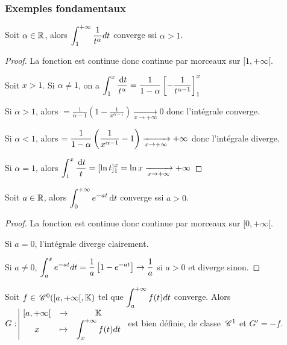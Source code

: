 \subsubsection{Exemples fondamentaux }

\begin{proposition}{}{}
    Soit $\alpha \in \mathbb{R}$, alors $\displaystyle \int_{1 }^{+ \infty   } \frac{1}{t^\alpha} dt$ converge
    ssi $\alpha > 1$. 
\end{proposition}

\begin{proof}
    La fonction est continue donc continue par morceaux sur $[1, + \infty[$.

    Soit $x > 1$. Si $\alpha \neq 1$, on a $\displaystyle \int_{1 }^{x } \frac {\,\mathrm{d}t} {t^\alpha} = \frac{1}{1 - \alpha} \left[ - \frac{1}{t^{\alpha - 1}} \right]^x_1$


    \avspace Si $\alpha > 1$, alors $= \frac{1}{\alpha - 1} \left( 1 - \frac{1}{x^{\alpha - 1}} \right) \xrightarrow[x \to + \infty   ]{} 0$
    donc l'intégrale converge. 
    
    \avspace Si $\alpha < 1$, alors $= \displaystyle \frac{1 }{ 1 - \alpha } \left( \frac{1}{x^{\alpha - 1}} - 1 \right) \xrightarrow[x \to + \infty   ]{} + \infty$
    donc l'intégrale diverge.

    \avspace Si $\alpha = 1$, alors $\displaystyle \int_{1 }^{x } \frac {\,\mathrm{d}t} t = [\ln t]^x_1 = \ln x \xrightarrow[x \to + \infty   ]{} + \infty$
\end{proof}

\begin{proposition}{}{}
    Soit $a \in \mathbb{R}$, alors $\displaystyle \int_{0 }^{ + \infty   } e^{-at} \,\mathrm{d}t$ converge ssi $a > 0$.
\end{proposition}

\begin{proof}
    La fonction est continue donc continue par morceaux sur $[0, + \infty[$.

    Si $a = 0$, l'intégrale diverge clairement.

    Si $a \neq 0$, $\displaystyle \int_a^x e^{-at} dt = \frac 1 a \left[ 1 - e^{-at} \right] \to \frac 1 a$ si $a > 0$ et diverge sinon.
\end{proof}



\begin{definition}{}{}
    Soit $f \in \,\mathscr C^{0} ([a, + \infty[, \mathbb{K})$ tel que $\displaystyle \int_a^{+ \infty} f(t) dt$ converge.
    Alors $G: \space \begin{array}{|ccc} \displaystyle [a, + \infty[ & \to & \displaystyle \mathbb{K} \\ \displaystyle x & \mapsto & \displaystyle \int_x^{+ \infty} f(t) dt \end{array}$ est bien définie, de 
    classe $\,\mathscr C^{1}$ et $G' = -f$. 
\end{definition}

